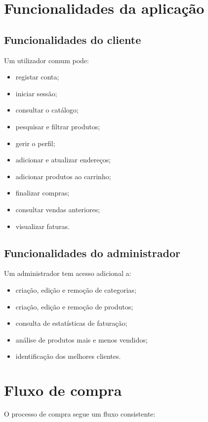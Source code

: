 \documentclass[10pt,a4paper]{report}
\begin{document}
\section{Funcionalidades da aplicação}

\subsection{Funcionalidades do cliente}

Um utilizador comum pode:

\begin{itemize}
    \item registar conta;
    \item iniciar sessão;
    \item consultar o catálogo;
    \item pesquisar e filtrar produtos;
    \item gerir o perfil;
    \item adicionar e atualizar endereços;
    \item adicionar produtos ao carrinho;
    \item finalizar compras;
    \item consultar vendas anteriores;
    \item visualizar faturas.
\end{itemize}

\subsection{Funcionalidades do administrador}

Um administrador tem acesso adicional a:

\begin{itemize}
    \item criação, edição e remoção de categorias;
    \item criação, edição e remoção de produtos;
    \item consulta de estatísticas de faturação;
    \item análise de produtos mais e menos vendidos;
    \item identificação dos melhores clientes.
\end{itemize}

\section{Fluxo de compra}

O processo de compra segue um fluxo consistente:
\end{document}
